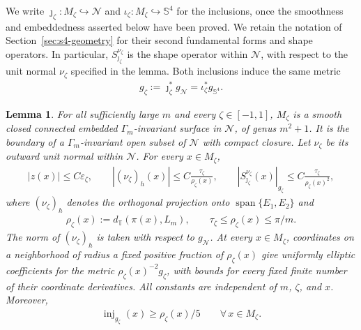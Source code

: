 \documentclass[a4paper,11pt,oneside,reqno]{amsart}
\numberwithin{equation}{section}
\newtheorem{lemma}[theorem]{Lemma}
\theoremstyle{definition}
\begin{document}
We write $\jmath_\zeta:M_\zeta\hookrightarrow\mathcal N$
and $\iota_\zeta:M_\zeta\hookrightarrow\mathbb S^4$ for
the inclusions, once the smoothness and embeddedness asserted
below have been proved. We retain the notation of
Section~\ref{sec:s4-geometry} for their second fundamental
forms and shape operators. In particular,
$S_{\jmath_\zeta}^{\nu_\zeta}$ is the shape operator
within $\mathcal N$, with respect to the unit normal
$\nu_\zeta$ specified in the lemma. Both inclusions induce
the same metric
%
\begin{align*}
    g_\zeta:=\jmath_\zeta^*g_{\mathcal N}
             =\iota_\zeta^*g_{\mathbb S^4}.
\end{align*}

\begin{lemma}
    \label{lem:s4-initial-geometry}
    For all sufficiently large $m$ and every
    $\zeta\in[-1,1]$, $M_\zeta$ is a smooth closed
    connected embedded $\Gamma_m$-invariant surface in
    $\mathcal N$, of genus $m^2+1$. It is the boundary
    of a $\Gamma_m$-invariant open subset of
    $\mathcal N$ with compact closure. Let $\nu_\zeta$
    be its outward unit normal within $\mathcal N$.
    For every $x\in M_\zeta$,
    \begin{align}
        \label{eq:s4-initial-geometry-bounds}
        |z(x)|\leq C\varepsilon_\zeta,\qquad
        |(\nu_\zeta)_h(x)|\leq
          C\frac{\tau_\zeta}{\rho_\zeta(x)},\qquad
        |S_{\jmath_\zeta}^{\nu_\zeta}(x)|_{g_\zeta}
          \leq C\frac{\tau_\zeta}{\rho_\zeta(x)^2},
    \end{align}
    where $(\nu_\zeta)_h$ denotes the orthogonal projection
    onto $\operatorname{span}\{E_1,E_2\}$ and
    \begin{align}
        \label{eq:s4-rho-on-double}
        \rho_\zeta(x)
        :=d_{\mathbb T}(\pi(x),L_m),
        \qquad
        \tau_\zeta\leq\rho_\zeta(x)\leq\pi/m.
    \end{align}
    The norm of $(\nu_\zeta)_h$ is taken with respect
    to $g_{\mathcal N}$. At every $x\in M_\zeta$,
    coordinates on a neighborhood of radius a fixed
    positive fraction of $\rho_\zeta(x)$ give uniformly
    elliptic coefficients for the metric
    $\rho_\zeta(x)^{-2}g_\zeta$, with bounds for every
    fixed finite number of their coordinate derivatives.
    All constants are independent of $m$, $\zeta$, and $x$.
    Moreover,
    \begin{align}
        \label{eq:s4-scaled-injectivity}
        \operatorname{inj}_{g_\zeta}(x)
        \geq\rho_\zeta(x)/5
        \qquad\forall\,x\in M_\zeta.
    \end{align}
\end{lemma}
\end{document}
